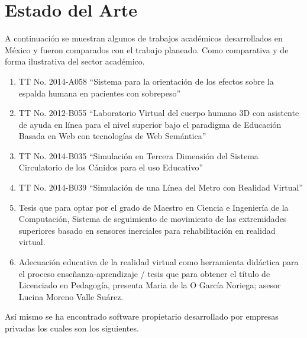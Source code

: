\section{Estado del Arte}
A continuación se muestran algunos de trabajos académicos desarrollados en México y fueron comparados con el trabajo planeado. Como comparativa y de forma ilustrativa 
del sector académico.\\
\newline
\begin{enumerate}
\item TT No. 2014-A058 “Sistema para la orientación de los efectos sobre la espalda humana en pacientes con sobrepeso”\cite{tt1}
\item TT No. 2012-B055 “Laboratorio Virtual del cuerpo humano 3D con asistente de ayuda en línea para el nivel superior bajo el paradigma de Educación Basada en Web con 
tecnologías de Web Semántica”\cite{tt2}
\item TT No. 2014-B035 “Simulación en Tercera Dimensión del Sistema Circulatorio de los Cánidos para el uso Educativo”\cite{tt3}
\item TT No. 2014-B039 “Simulación de una Línea del Metro con Realidad Virtual”\cite{tt4}
\item Tesis que para optar por el grado de Maestro en Ciencia e Ingeniería de la Computación, Sistema de seguimiento de movimiento de las extremidades superiores basado 
en sensores inerciales para rehabilitación en realidad virtual.\cite{mastersthesis1}
\item Adecuación educativa de la realidad virtual como herramienta didáctica para el proceso enseñanza-aprendizaje / tesis que para obtener el título de Licenciado en 
Pedagogía, presenta Maria de la O García Noriega; asesor Lucina Moreno Valle Suárez.\cite{te1}
\end{enumerate}
Así mismo se ha encontrado software propietario desarrollado por empresas privadas los cuales son los siguientes.\\
